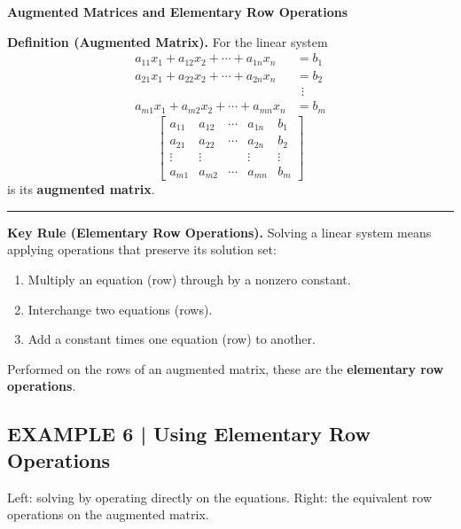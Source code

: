 \documentclass{article}
\newcommand{\redheading}[1]{{\vspace{2mm}\noindent\Large\bfseries\color{red!55!black} #1\par}\vspace{2mm}}
\theoremstyle{mystyle}
\begin{document}
\redheading{Augmented Matrices and Elementary Row Operations}
\begin{tcolorbox}[
    colback=teal!4,
    colframe=teal!65!black,
    title=Definition \& Key Rules,
    fonttitle=\bfseries,
    boxrule=0.5mm,
    arc=3mm
    ]
    \textbf{\textcolor{teal!65!black}{Definition (Augmented Matrix).}}\quad
    For the linear system
    \[
    \begin{aligned}
    a_{11}x_1+a_{12}x_2+\cdots+a_{1n}x_n&=b_1\\
    a_{21}x_1+a_{22}x_2+\cdots+a_{2n}x_n&=b_2\\
    &\ \ \vdots\\
    a_{m1}x_1+a_{m2}x_2+\cdots+a_{mn}x_n&=b_m
    \end{aligned}
    \]
    \[
    \begin{bmatrix}
    a_{11}&a_{12}&\cdots&a_{1n}&b_1\\
    a_{21}&a_{22}&\cdots&a_{2n}&b_2\\
    \vdots&\vdots&&\vdots&\vdots\\
    a_{m1}&a_{m2}&\cdots&a_{mn}&b_m
    \end{bmatrix}
    \]
    is its \textbf{augmented matrix}.

    \noindent\textcolor{teal!50!black}{\rule{\linewidth}{0.4pt}}

    \textbf{\textcolor{teal!65!black}{Key Rule (Elementary Row Operations).}}\quad
    Solving a linear system means applying operations that preserve its solution set:
    \begin{enumerate}
        \item Multiply an equation (row) through by a nonzero constant.
        \item Interchange two equations (rows).
        \item Add a constant times one equation (row) to another.
    \end{enumerate}
    Performed on the rows of an augmented matrix, these are the \textbf{elementary row operations}.
\end{tcolorbox}

\subsection*{EXAMPLE 6 | Using Elementary Row Operations}
Left: solving by operating directly on the equations. Right: the equivalent row operations on the augmented matrix.
\end{document}
